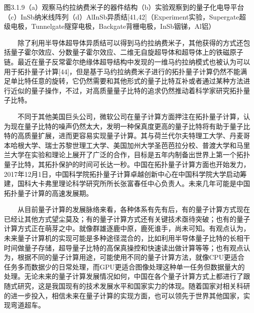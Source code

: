 \documentclass[a4paper,11pt,english]{sphinxmanual}
\begin{document}

\begin{center}图3.1.9（a）观察马约拉纳费米子的器件结构（b）实验观察到的量子化电导平台（c）InSb纳米线阵列（d）Al\sphinxhyphen{}InSb异质结{[}41,42{]}（Experiment\sphinxhyphen{}实验，Super\sphinxhyphen{}gate\sphinxhyphen{}超级电极，Tunnel\sphinxhyphen{}gate\sphinxhyphen{}隧穿电极，Back\sphinxhyphen{}gate\sphinxhyphen{}背栅电极，InSb\sphinxhyphen{}铟锑，Al\sphinxhyphen{}铝）
\end{center}
\sphinxAtStartPar
  除了利用半导体\sphinxhyphen{}超导体异质结可以得到马约拉纳费米子，其他获得的方式还包括量子霍尔效应、分数量子霍尔效应、二维无自旋超导体和超导体上的铁磁原子链。最近在量子反常霍尔绝缘体\sphinxhyphen{}超导结构中发现的一维马约拉纳模式也被认为可以用于拓扑量子计算{[}44{]}，但是基于马约拉纳费米子进行的拓扑量子计算仍然不能满足单比特任意的旋转，它仍然需要和其他形式的量子比特互补或者通过某种方法进行近似的量子操作，不过，对高质量量子比特的追求仍然推动着科学家研究拓扑量子比特。

\sphinxAtStartPar
  不同于其他美国巨头公司，微软公司在量子计算方面押注在拓扑量子计算，认为现在量子比特的噪声仍然太大，发明一种保真度更高的量子比特将有助于量子比特的高质量扩展，进而更容易实现量子计算。其与荷兰代尔夫特理工大学、丹麦哥本哈根大学、瑞士苏黎世理工大学、美国加州大学圣芭芭拉分校、普渡大学和马里兰大学在实验和理论上展开了广泛的合作，目标是五年内制备出世界上第一个拓扑量子比特，其拓扑保护的时间可长达一秒。中国在拓扑量子计算方面也开始发力，2017年12月1日，中国科学院拓扑量子计算卓越创新中心在中国科学院大学启动筹建，国科大卡弗里理论科学研究所所长张富春任中心负责人。未来几年可能是中国拓扑量子计算的高速发展期。

\sphinxAtStartPar
  从目前量子计算的发展脉络来看，各种体系有先有后，有的量子计算方式现在已经让其他方式望尘莫及；有的量子计算方式还有关键技术亟待突破；也有的量子计算方式正在萌芽之中。就像群雄逐鹿中原，鹿死谁手，尚未可知。有观点认为，未来量子计算机的实现可能是多种途径混合的，比如利用半导体量子比特的长相干时间做量子存储，超导量子比特的高保真操控和快速读出做计算等等；也有观点认为，根据不同的量子计算用途，可能使用不同的量子计算方法，就像CPU更适合任务多而数据少的日常处理，而GPU更适合图像处理这种单一任务但数据量大的处理。无论未来的量子计算发展情况如何，中国在各个量子计算方式上都进行了跟随式研究，这是我国现有的技术发展水平和国家实力的体现。随着国家对相关科研的进一步投入，相信未来在量子计算的实现方面，也可以领先于世界其他国家，实现弯道超车。
\end{document}
